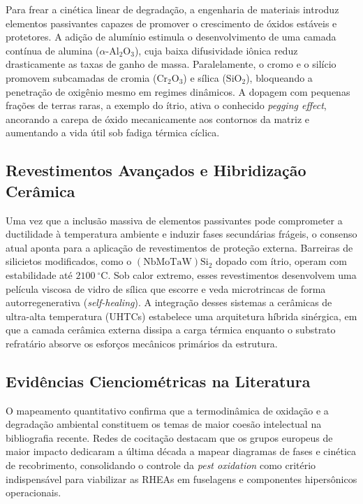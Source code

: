 Para frear a cinética linear de degradação, a engenharia de materiais introduz elementos passivantes capazes de promover o crescimento de óxidos estáveis e protetores. A adição de alumínio estimula o desenvolvimento de uma camada contínua de alumina ($\alpha\text{-}\mathrm{Al}_2\mathrm{O}_3$), cuja baixa difusividade iônica reduz drasticamente as taxas de ganho de massa. Paralelamente, o cromo e o silício promovem subcamadas de cromia ($\mathrm{Cr}_2\mathrm{O}_3$) e sílica ($\mathrm{SiO}_2$), bloqueando a penetração de oxigênio mesmo em regimes dinâmicos. A dopagem com pequenas frações de terras raras, a exemplo do ítrio, ativa o conhecido \emph{pegging effect}, ancorando a carepa de óxido mecanicamente aos contornos da matriz e aumentando a vida útil sob fadiga térmica cíclica.

\subsection{Revestimentos Avançados e Hibridização Cerâmica}\label{revestimentos-avancados-hibridizacao}

Uma vez que a inclusão massiva de elementos passivantes pode comprometer a ductilidade à temperatura ambiente e induzir fases secundárias frágeis, o consenso atual aponta para a aplicação de revestimentos de proteção externa. Barreiras de silicietos modificados, como o $(\mathrm{NbMoTaW})\mathrm{Si}_2$ dopado com ítrio, operam com estabilidade até $2100~^\circ\mathrm{C}$. Sob calor extremo, esses revestimentos desenvolvem uma película viscosa de vidro de sílica que escorre e veda microtrincas de forma autorregenerativa (\emph{self-healing}). A integração desses sistemas a cerâmicas de ultra-alta temperatura (UHTCs) estabelece uma arquitetura híbrida sinérgica, em que a camada cerâmica externa dissipa a carga térmica enquanto o substrato refratário absorve os esforços mecânicos primários da estrutura.

\subsection{Evidências Cienciométricas na Literatura}\label{evidencias-cienciometricas-oxidacao}

O mapeamento quantitativo confirma que a termodinâmica de oxidação e a degradação ambiental constituem os temas de maior coesão intelectual na bibliografia recente. Redes de cocitação destacam que os grupos europeus de maior impacto dedicaram a última década a mapear diagramas de fases e cinética de recobrimento, consolidando o controle da \emph{pest oxidation} como critério indispensável para viabilizar as RHEAs em fuselagens e componentes hipersônicos operacionais.
